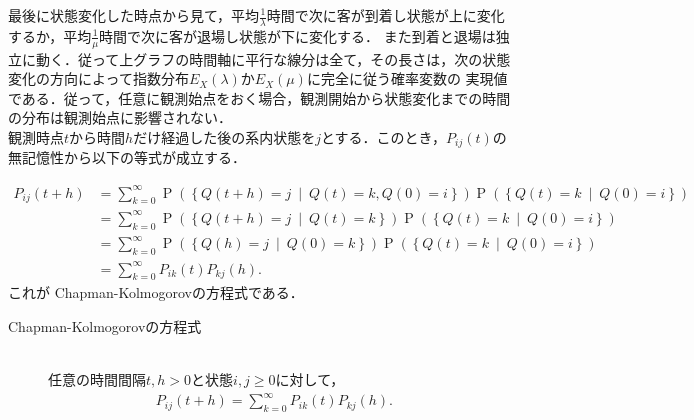 \documentclass[a4j,papersize,disablejfam,slide,14pt]{jsarticle}
\def\cprob#1#2{\operatorname{P} \left(\left\{ #1 \ \middle|\ #2 \right\}\right)} %
\begin{document}
    最後に状態変化した時点から見て，平均$\frac{1}{\lambda}$時間で次に客が到着し状態が上に変化するか，平均$\frac{1}{\mu}$時間で次に客が退場し状態が下に変化する．
    また到着と退場は独立に動く．従って上グラフの時間軸に平行な線分は全て，その長さは，次の状態変化の方向によって指数分布$E_X(\lambda)$か$E_X(\mu)$に完全に従う確率変数の
    実現値である．従って，任意に観測始点をおく場合，観測開始から状態変化までの時間の分布は観測始点に影響されない．\\
    観測時点$t$から時間$h$だけ経過した後の系内状態を$j$とする．このとき，$P_{ij}(t)$の無記憶性から以下の等式が成立する．

    \begin{align}
    	P_{ij}(t+h) &= \sum_{k=0}^{\infty} \cprob{Q(t+h) = j}{Q(t) = k, Q(0) = i}\cprob{Q(t) = k}{Q(0) = i} \\
        &= \sum_{k=0}^{\infty} \cprob{Q(t+h) = j}{Q(t) = k}\cprob{Q(t) = k}{Q(0) = i} \\
        &= \sum_{k=0}^{\infty} \cprob{Q(h) = j}{Q(0) = k}\cprob{Q(t) = k}{Q(0) = i} \\
        &= \sum_{k=0}^{\infty} P_{ik}(t)P_{kj}(h).
    \end{align}
    これが {\rm Chapman-Kolmogorov}の方程式である．
    \begin{screen}
    	\begin{description}
        	\item[{\rm Chapman-Kolmogorov}の方程式]\mbox{}\\
            	任意の時間間隔$t,h > 0$と状態$i,j \geq 0$に対して，
                \begin{align}
            		P_{ij}(t+h) = \sum_{k=0}^{\infty} P_{ik}(t)P_{kj}(h). & \label{eq:chapman-kolmogorov}
                \end{align}
        \end{description}
    \end{screen}
\end{document}
